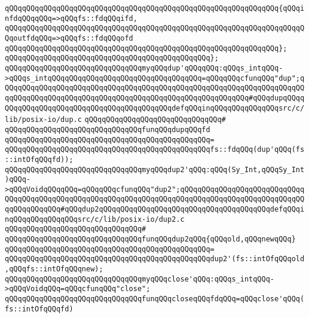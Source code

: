 \verb|qQQqqQQqqQQqqQQqqQQqqQQqqQQqqQQqqQQqqQQqqQQqqQQqqQQqqQQqqQQqqQQq{qQQqinfdqQQqqQQq=>qQQqfs::fdqQQqifd,|\newline
\verb|qQQqqQQqqQQqqQQqqQQqqQQqqQQqqQQqqQQqqQQqqQQqqQQqqQQqqQQqqQQqqQQqqQQqqQQqoutfdqQQq=>qQQqfs::fdqQQqofd|\newline
\verb|qQQqqQQqqQQqqQQqqQQqqQQqqQQqqQQqqQQqqQQqqQQqqQQqqQQqqQQqqQQqqQQq};|\newline
\verb|qQQqqQQqqQQqqQQqqQQqqQQqqQQqqQQqqQQqqQQqqQQqqQQq};|\newline
\newline
\verb|qQQqqQQqqQQqqQQqqQQqqQQqqQQqqQQqmyqQQqdup'qQQqqQQq:qQQqs_intqQQq->qQQqs_intqQQqqQQqqQQqqQQqqQQqqQQqqQQqqQQqqQQq=qQQqqQQqcfunqQQq"dup";qQQqqQQqqQQqqQQqqQQqqQQqqQQqqQQqqQQqqQQqqQQqqQQqqQQqqQQqqQQqqQQqqQQqqQQqqQQqqQQqqQQqqQQqqQQqqQQqqQQqqQQqqQQqqQQqqQQqqQQqqQQqqQQq#qQQqdupqQQqqQQqqQQqqQQqqQQqqQQqqQQqqQQqqQQqqQQqqQQqdefqQQqinqQQqqQQqqQQqqQQqsrc/c/lib/posix-io/dup.c|\newline
\verb|qQQqqQQqqQQqqQQqqQQqqQQqqQQqqQQq#|\newline
\verb|qQQqqQQqqQQqqQQqqQQqqQQqqQQqqQQqfunqQQqdupqQQqfd|\newline
\verb|qQQqqQQqqQQqqQQqqQQqqQQqqQQqqQQqqQQqqQQqqQQqqQQq=|\newline
\verb|qQQqqQQqqQQqqQQqqQQqqQQqqQQqqQQqqQQqqQQqqQQqqQQqfs::fdqQQq(dup'qQQq(fs::intOfqQQqfd));|\newline
\newline
\verb|qQQqqQQqqQQqqQQqqQQqqQQqqQQqqQQqmyqQQqdup2'qQQq:qQQq(Sy_Int,qQQqSy_Int)qQQq->qQQqVoidqQQqqQQq=qQQqqQQqcfunqQQq"dup2";qQQqqQQqqQQqqQQqqQQqqQQqqQQqqQQqqQQqqQQqqQQqqQQqqQQqqQQqqQQqqQQqqQQqqQQqqQQqqQQqqQQqqQQqqQQqqQQqqQQqqQQqqQQqqQQq#qQQqdup2qQQqqQQqqQQqqQQqqQQqqQQqqQQqqQQqqQQqqQQqdefqQQqinqQQqqQQqqQQqqQQqsrc/c/lib/posix-io/dup2.c|\newline
\verb|qQQqqQQqqQQqqQQqqQQqqQQqqQQqqQQq#|\newline
\verb|qQQqqQQqqQQqqQQqqQQqqQQqqQQqqQQqfunqQQqdup2qQQq{qQQqold,qQQqnewqQQq}|\newline
\verb|qQQqqQQqqQQqqQQqqQQqqQQqqQQqqQQqqQQqqQQqqQQqqQQq=|\newline
\verb|qQQqqQQqqQQqqQQqqQQqqQQqqQQqqQQqqQQqqQQqqQQqqQQqdup2'(fs::intOfqQQqold,qQQqfs::intOfqQQqnew);|\newline
\newline
\verb|qQQqqQQqqQQqqQQqqQQqqQQqqQQqqQQqmyqQQqclose'qQQq:qQQqs_intqQQq->qQQqVoidqQQq=qQQqcfunqQQq"close";|\newline
\verb|qQQqqQQqqQQqqQQqqQQqqQQqqQQqqQQqfunqQQqcloseqQQqfdqQQq=qQQqclose'qQQq(fs::intOfqQQqfd)|\newline

